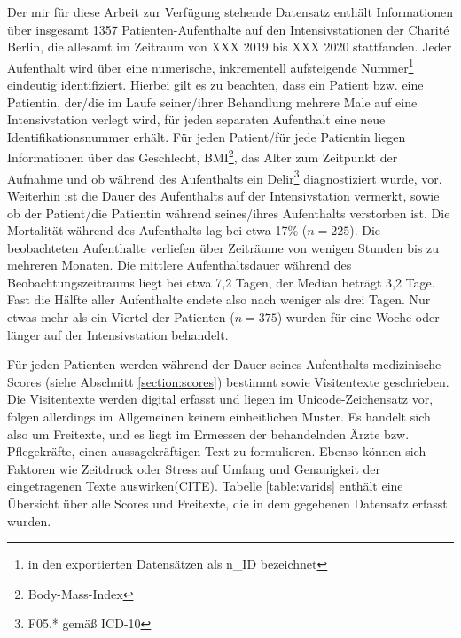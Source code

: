 Der mir für diese Arbeit zur Verfügung stehende Datensatz enthält Informationen über insgesamt 1357 Patienten-Aufenthalte auf den Intensivstationen der Charité Berlin, die allesamt im Zeitraum von XXX 2019 bis XXX 2020 stattfanden. Jeder Aufenthalt wird über eine numerische, inkrementell aufsteigende Nummer\footnote{in den exportierten Datensätzen als n\_ID bezeichnet} eindeutig identifiziert. Hierbei gilt es zu beachten, dass ein Patient bzw. eine Patientin, der/die im Laufe seiner/ihrer Behandlung mehrere Male auf eine Intensivstation verlegt wird, für jeden separaten Aufenthalt eine neue Identifikationsnummer erhält. Für jeden Patient/für jede Patientin liegen Informationen über das Geschlecht, BMI\footnote{Body-Mass-Index}, das Alter zum Zeitpunkt der Aufnahme und ob während des Aufenthalts ein Delir\footnote{F05.* gemäß ICD-10} diagnostiziert wurde, vor. Weiterhin ist die Dauer des Aufenthalts auf der Intensivstation vermerkt, sowie ob der Patient/die Patientin während seines/ihres Aufenthalts verstorben ist. Die Mortalität während des Aufenthalts lag bei etwa 17\% ($n=225$). Die beobachteten Aufenthalte verliefen über Zeiträume von wenigen Stunden bis zu mehreren Monaten. Die mittlere Aufenthaltsdauer während des Beobachtungszeitraums liegt bei etwa 7,2 Tagen, der Median beträgt 3,2 Tage. Fast die Hälfte aller Aufenthalte endete also nach weniger als drei Tagen. Nur etwas mehr als ein Viertel der Patienten ($n=375$) wurden für eine Woche oder länger auf der Intensivstation behandelt.

Für jeden Patienten werden während der Dauer seines Aufenthalts medizinische Scores (siehe Abschnitt \ref{section:scores}) bestimmt sowie Visitentexte geschrieben. Die Visitentexte werden digital erfasst und liegen im Unicode-Zeichensatz vor, folgen allerdings im Allgemeinen keinem einheitlichen Muster. Es handelt sich also um Freitexte, und es liegt im Ermessen der behandelnden Ärzte bzw. Pflegekräfte, einen aussagekräftigen Text zu formulieren. Ebenso können sich Faktoren wie Zeitdruck oder Stress auf Umfang und Genauigkeit der eingetragenen Texte auswirken(CITE).
Tabelle \ref{table:varids} enthält eine Übersicht über alle Scores und Freitexte, die in dem gegebenen Datensatz erfasst wurden.

